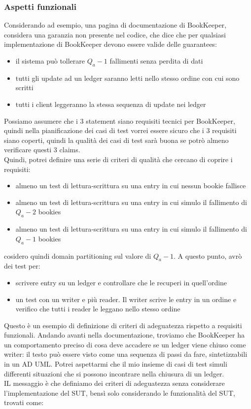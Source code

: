 \documentclass{article}
\begin{document}
\subsubsection{Aspetti funzionali}
Considerando ad esempio, una pagina di documentazione di BookKeeper, considera una garanzia non presente nel codice, che dice che per qualsiasi implementazione di BookKeeper devono essere valide delle guarantees:
\begin{itemize}
\item il sistema può tollerare $Q_a - 1$ fallimenti senza perdita di dati
\item tutti gli update ad un ledger saranno letti nello stesso ordine con cui sono scritti
\item tutti i client leggeranno la stessa sequenza di update nei ledger
\end{itemize}
Possiamo assumere che i 3 statement siano requisiti tecnici per BookKeeper, quindi nella pianificazione dei casi di test vorrei essere sicuro che i 3 requisiti siano coperti, quindi la qualità dei casi di test sarà buona se potrò almeno verificare questi 3 claims.\\ Quindi, potrei definire una serie di criteri di qualità che cercano di coprire i requisiti:
\begin{itemize}
\item almeno un test di lettura-scrittura su una entry in cui nessun bookie fallisce
\item almeno un test di lettura-scrittura su una entry in cui simulo il fallimento di $Q_a - 2$ bookies
\item almeno un test di lettura-scrittura su una entry in cui simulo il fallimento di $Q_a - 1$ bookies
\end{itemize}
cosidero quindi domain partitioning sul valore di $Q_a -1$. A questo punto, avrò dei test per:
\begin{itemize}
\item scrivere entry su un ledger e controllare che le recuperi in quell'ordine
\item un test con un writer e più reader. Il writer scrive le entry in un ordine e verifico che tutti i reader le leggano nello stesso ordine
\end{itemize}
Questo è un esempio di definizione di criteri di adeguatezza rispetto a requisiti funzionali. Andando avanti nella documentazione, troviamo che BookKeeper ha un comportamento preciso di cosa deve accadere se un ledger viene chiuso come writer: il testo può essere visto come una sequenza di passi da fare, sintetizzabili in un AD UML. Potrei aspettarmi che il mio insieme di casi di test simuli differenti situazioni che si possono incontrare nella chiusura di un ledger.\\ IL messaggio è che definiamo dei criteri di adeguatezza senza considerare l'implementazione del SUT, bensì solo considerando le funzionalità del SUT, trovati come:
\end{document}

